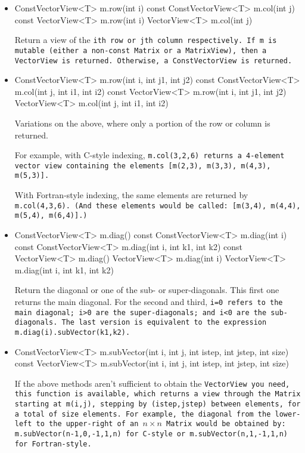 \begin{itemize}
\item
\begin{tmvcode}
ConstVectorView<T> m.row(int i) const
ConstVectorView<T> m.col(int j) const
VectorView<T> m.row(int i)
VectorView<T> m.col(int j)
\end{tmvcode}
Return a view of the \tt{i}th row or \tt{j}th column respectively.
If \tt{m} is mutable (either a non-\tt{const Matrix} or a \tt{MatrixView}),
then a \tt{VectorView} is returned.  Otherwise, a \tt{ConstVectorView}
is returned.

\item
\begin{tmvcode}
ConstVectorView<T> m.row(int i, int j1, int j2) const
ConstVectorView<T> m.col(int j, int i1, int i2) const
VectorView<T> m.row(int i, int j1, int j2)
VectorView<T> m.col(int j, int i1, int i2) 
\end{tmvcode}
Variations on the above, where only a portion of the row or column
is returned.  

For example, with C-style indexing, \tt{m.col(3,2,6)} returns a 4-element
vector view containing the elements
[\tt{m(2,3), m(3,3), m(4,3), m(5,3)}].

With Fortran-style indexing, the same elements are returned by \tt{m.col(4,3,6)}. 
(And these elements would be called: [\tt{m(3,4), m(4,4), m(5,4), m(6,4)}].)

\item
\begin{tmvcode}
ConstVectorView<T> m.diag() const
ConstVectorView<T> m.diag(int i) const 
ConstVectorView<T> m.diag(int i, int k1, int k2) const
VectorView<T> m.diag()
VectorView<T> m.diag(int i)
VectorView<T> m.diag(int i, int k1, int k2)
\end{tmvcode}
Return the diagonal or one of the sub- or super-diagonals.
This first one returns the main diagonal.  For the second and third,
\tt{i=0} refers to the main diagonal; \tt{i>0} are the super-diagonals;
and \tt{i<0} are the sub-diagonals.  The last version is equivalent to the
expression 
\tt{m.diag(i).subVector(k1,k2)}.
\item
\begin{tmvcode}
ConstVectorView<T> m.subVector(int i, int j, int istep, int jstep, 
      int size) const
VectorView<T> m.subVector(int i, int j, int istep, int jstep, int size) 
\end{tmvcode}
If the above methods aren't sufficient to obtain the \tt{VectorView} you
need, this function is available, which returns a view through the \tt{Matrix} 
starting at \tt{m(i,j)}, stepping by \tt{(istep,jstep)} between elements,
for a total of \tt{size} elements.  For example, the diagonal
from the lower-left to the upper-right of an $n \times n$ \tt{Matrix} 
would be obtained by: \tt{m.subVector(n-1,0,-1,1,n)} for C-style or
\tt{m.subVector(n,1,-1,1,n)} for Fortran-style.


\end{itemize}
